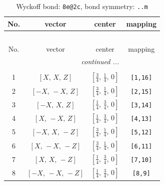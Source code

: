 \documentclass[fleqn,8pt]{jsarticle}
\begin{document}
\begin{longtable}{cccc}
\caption{Wyckoff bond: {\tt 8e@2c}, bond symmetry: {\tt ..m}}
 \\
 \hline \hline
No. & vector & center & mapping \\ \hline \endfirsthead

\multicolumn{3}{l}{\tablename\ \thetable{}} \\
 \hline \hline
No. & vector & center & mapping \\ \hline \endhead

 \hline \hline
\multicolumn{3}{r}{\footnotesize\it continued ...} \\ \endfoot

 \hline \hline
\multicolumn{3}{r}{} \\ \endlastfoot

1 & $\left[ X,\, X,\, Z \right]$ & $\left[ \frac{3}{4},\, \frac{1}{4},\, 0 \right]$ & {\tt [1,16]} \\ \hline
2 & $\left[ - X,\, - X,\, Z \right]$ & $\left[ \frac{3}{4},\, \frac{1}{4},\, 0 \right]$ & {\tt [2,15]} \\ \hline
3 & $\left[ - X,\, X,\, Z \right]$ & $\left[ \frac{1}{4},\, \frac{3}{4},\, 0 \right]$ & {\tt [3,14]} \\ \hline
4 & $\left[ X,\, - X,\, Z \right]$ & $\left[ \frac{1}{4},\, \frac{3}{4},\, 0 \right]$ & {\tt [4,13]} \\ \hline
5 & $\left[ - X,\, X,\, - Z \right]$ & $\left[ \frac{3}{4},\, \frac{1}{4},\, 0 \right]$ & {\tt [5,12]} \\ \hline
6 & $\left[ X,\, - X,\, - Z \right]$ & $\left[ \frac{3}{4},\, \frac{1}{4},\, 0 \right]$ & {\tt [6,11]} \\ \hline
7 & $\left[ X,\, X,\, - Z \right]$ & $\left[ \frac{1}{4},\, \frac{3}{4},\, 0 \right]$ & {\tt [7,10]} \\ \hline
8 & $\left[ - X,\, - X,\, - Z \right]$ & $\left[ \frac{1}{4},\, \frac{3}{4},\, 0 \right]$ & {\tt [8,9]} \\
\end{longtable}
\renewcommand{\arraystretch}{1.2}
\end{document}
